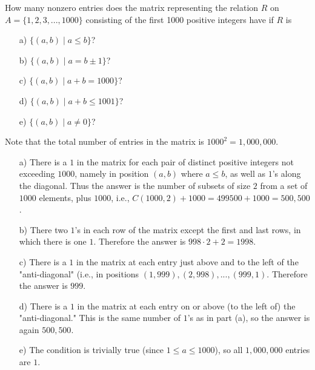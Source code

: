 \begin{exercise}
	How many nonzero entries does the matrix representing the relation \( R \) on \( A = \{1, 2, 3, ..., 1000\} \) consisting of the first 1000 positive integers have if \( R \) is
	\begin{enumerate}
		\item[a)] \(\{(a, b) \mid a \leq b\}\)?
		\item[b)] \(\{(a, b) \mid a = b \pm 1\}\)?
		\item[c)] \(\{(a, b) \mid a + b = 1000\}\)?
		\item[d)] \(\{(a, b) \mid a + b \leq 1001\}\)?
		\item[e)] \(\{(a, b) \mid a \neq 0\}\)?
	\end{enumerate}
\end{exercise}

\begin{solution}
	Note that the total number of entries in the matrix is \(1000^2 = 1,000,000\).
	\begin{enumerate}
		\item[a)] There is a \(1\) in the matrix for each pair of distinct positive integers not exceeding \(1000\), namely in position \((a, b)\) where \(a \leq b\), as well as \(1\)'s along the diagonal. Thus the answer is the number of subsets of size \(2\) from a set of \(1000\) elements, plus \(1000\), i.e., \(C(1000, 2) + 1000 = 499500 + 1000 = 500,500\).
		
		\item[b)] There two \(1\)'s in each row of the matrix except the first and last rows, in which there is one \(1\). Therefore the answer is \(998 \cdot 2 + 2 = 1998\).
		
		\item[c)] There is a \(1\) in the matrix at each entry just above and to the left of the "anti-diagonal" (i.e., in positions \((1, 999), (2, 998), ..., (999, 1)\). Therefore the answer is \(999\).
		
		\item[d)] There is a \(1\) in the matrix at each entry on or above (to the left of) the "anti-diagonal." This is the same number of \(1\)'s as in part (a), so the answer is again \(500,500\).
		
		\item[e)] The condition is trivially true (since \(1 \leq a \leq 1000\)), so all \(1,000,000\) entries are \(1\).
	\end{enumerate}
\end{solution}

